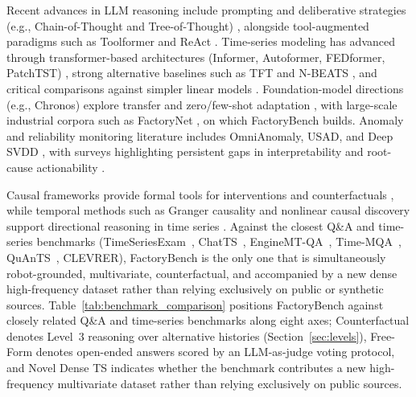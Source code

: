 Recent advances in LLM reasoning include prompting and deliberative strategies (e.g., Chain-of-Thought and Tree-of-Thought) \cite{wei2022chain,yao2023tree}, alongside tool-augmented paradigms such as Toolformer and ReAct \cite{schick2023toolformer,yao2023react,qin2023tool}. Time-series modeling has advanced through transformer-based architectures (Informer, Autoformer, FEDformer, PatchTST) \cite{zhou2021informer,wu2021autoformer,zhou2022fedformer,nie2022time}, strong alternative baselines such as TFT and N-BEATS \cite{lim2021tft,oreshkin2020nbeats}, and critical comparisons against simpler linear models \cite{zeng2023transformers}. Foundation-model directions (e.g., Chronos) explore transfer and zero/few-shot adaptation \cite{ansari2024chronos,das2024decoder}, with large-scale industrial corpora such as FactoryNet \cite{othman2026factorynetlargescaledatasetindustrial}, on which FactoryBench builds. Anomaly and reliability monitoring literature includes OmniAnomaly, USAD, and Deep SVDD \cite{su2019omni,audibert2020usad,ruff2018deep}, with surveys highlighting persistent gaps in interpretability and root-cause actionability \cite{chalapathy2019survey,lavin2015numenta}.

Causal frameworks provide formal tools for interventions and counterfactuals \cite{pearl2009causality,peters2017elements,rubin1974causal}, while temporal methods such as Granger causality and nonlinear causal discovery support directional reasoning in time series \cite{granger1969causal,runge2019causal}. \workshoprelatedworknote{}
\ifworkshopcompact
Against the closest Q\&A and time-series benchmarks (TimeSeriesExam~\cite{cai2024timeseriesexamtimeseriesunderstanding}, ChatTS~\cite{Xie_2025}, EngineMT-QA~\cite{wang2025itformerbridgingtimeseries}, Time-MQA~\cite{kong2025timemqatimeseriesmultitask}, QuAnTS~\cite{wenkel2024quants}, CLEVRER), FactoryBench is the only one that is simultaneously robot-grounded, multivariate, counterfactual, and accompanied by a new dense high-frequency dataset rather than relying exclusively on public or synthetic sources.
\else
Table~\ref{tab:benchmark_comparison} positions FactoryBench against closely related Q\&A and time-series benchmarks along eight axes; Counterfactual denotes Level~3 reasoning over alternative histories (Section~\ref{sec:levels}), Free-Form denotes open-ended answers scored by an LLM-as-judge voting protocol, and Novel Dense TS indicates whether the benchmark contributes a new high-frequency multivariate dataset rather than relying exclusively on public sources.
\fi

